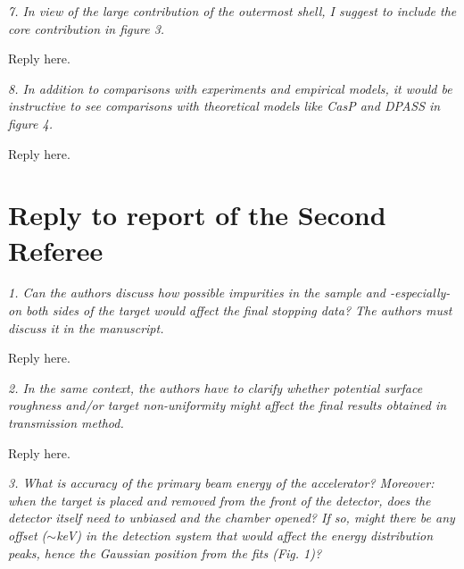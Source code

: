 \documentclass[a4paper,10pt]{article}
\begin{document}
\vspace{0.25cm}
\textsl{7. In view of the large contribution of the outermost shell, I 
suggest to include the core contribution in figure 3.}

\vspace{0.1cm}
{\color{red}Reply here.}

\vspace{0.25cm}
\textsl{8. In addition to comparisons with experiments and empirical 
models, it would be instructive to see comparisons with theoretical 
models like CasP and DPASS in figure 4.}

\vspace{0.1cm}
{\color{red}Reply here.}




\newpage
\section{Reply to report of the Second Referee}

\textsl{1. Can the authors discuss how possible impurities in the sample and -especially- on both sides of the target would affect the final
stopping data? The authors must discuss it in the manuscript.}

\vspace{0.1cm}
{\color{red}Reply here.}

\vspace{0.25cm}
\textsl{2. In the same context, the authors have to clarify whether potential
surface roughness and/or target non-uniformity might affect the final
results obtained in transmission method.}

\vspace{0.1cm}
{\color{red}Reply here.}

\vspace{0.25cm}
\textsl{3. What is accuracy of the primary beam energy of the accelerator?
Moreover: when the target is placed and removed from the front of the
detector, does the detector itself need to unbiased and the chamber
opened? If so, might there be any offset ($\sim$keV) in the detection
system that would affect the energy distribution peaks, hence the
Gaussian position from the fits (Fig. 1)?}
\end{document}
